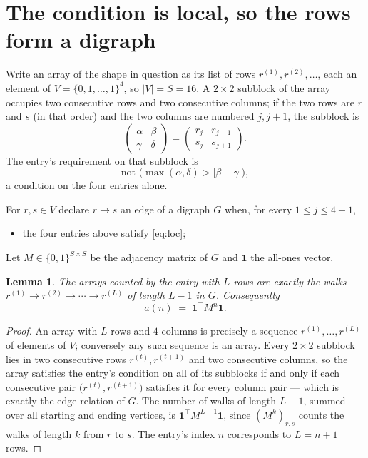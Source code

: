\documentclass[11pt,a4paper]{article}
\theoremstyle{plain}
\newtheorem{lemma}[theorem]{Lemma}
\theoremstyle{definition}
\begin{document}
\section{The condition is local, so the rows form a digraph}

Write an array of the shape in question as its list of rows
$r^{(1)},r^{(2)},\dots$, each an element of
$V=\{0,1,\dots,1\}^{4}$, so $|V|=S=16$. A $2\times2$ subblock of the array
occupies two consecutive rows and two consecutive columns; if the two rows are $r$
and $s$ (in that order) and the two columns are numbered $j,j+1$,
the subblock is
\[
\begin{pmatrix}\alpha&\beta\\\gamma&\delta\end{pmatrix}=\begin{pmatrix}r_j&r_{j+1}\\s_j&s_{j+1}\end{pmatrix}.
\]
The entry's requirement on that subblock is
\begin{equation}\label{eq:loc}
\text{not }\bigl(\max(\alpha,\delta)>|\beta-\gamma|\bigr),
\end{equation}
a condition on the four entries alone.

For $r,s\in V$ declare $r\to s$ an edge of a digraph $G$ when, for every
$1\le j\le 4-1$,
\begin{itemize}
\item the four entries above satisfy \eqref{eq:loc};

\end{itemize}
Let $M\in\{0,1\}^{S\times S}$ be the adjacency matrix of $G$ and $\mathbf{1}$ the
all-ones vector.

\begin{lemma}\label{lem:walk}
The arrays counted by the entry with $L$ rows are exactly the walks
$r^{(1)}\to r^{(2)}\to\cdots\to r^{(L)}$ of length $L-1$ in $G$. Consequently
\[
a(n)\;=\;\mathbf{1}^{\!\top}M^{n}\mathbf{1} .
\]
\end{lemma}

\begin{proof}
An array with $L$ rows and $4$ columns is precisely a sequence
$r^{(1)},\dots,r^{(L)}$ of elements of $V$; conversely any such sequence is an array.
Every $2\times2$ subblock lies in two consecutive rows $r^{(t)},r^{(t+1)}$ and two
consecutive columns, so the array satisfies the entry's condition on all of its subblocks
if and only if each consecutive pair $\bigl(r^{(t)},r^{(t+1)}\bigr)$ satisfies it for
every column pair --- which is exactly the edge relation of $G$. The number of walks of
length $L-1$, summed over all starting and ending vertices, is
$\mathbf{1}^{\!\top}M^{L-1}\mathbf{1}$, since $(M^{k})_{r,s}$ counts the walks of
length $k$ from $r$ to $s$. The entry's index $n$ corresponds to $L=n+1$ rows.
\end{proof}
\end{document}
